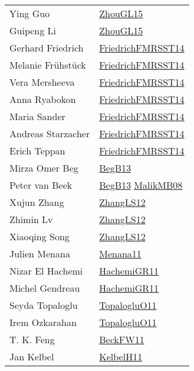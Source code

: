 {\begin{longtable}{p{4cm}p{15cm}}
Ying Guo & \href{papers/ZhouGL15.pdf}{ZhouGL15}\cite{ZhouGL15} \\
Guipeng Li & \href{papers/ZhouGL15.pdf}{ZhouGL15}\cite{ZhouGL15} \\
Gerhard Friedrich & \href{papers/FriedrichFMRSST14.pdf}{FriedrichFMRSST14}\cite{FriedrichFMRSST14} \\
Melanie Fr{\"{u}}hst{\"{u}}ck & \href{papers/FriedrichFMRSST14.pdf}{FriedrichFMRSST14}\cite{FriedrichFMRSST14} \\
Vera Mersheeva & \href{papers/FriedrichFMRSST14.pdf}{FriedrichFMRSST14}\cite{FriedrichFMRSST14} \\
Anna Ryabokon & \href{papers/FriedrichFMRSST14.pdf}{FriedrichFMRSST14}\cite{FriedrichFMRSST14} \\
Maria Sander & \href{papers/FriedrichFMRSST14.pdf}{FriedrichFMRSST14}\cite{FriedrichFMRSST14} \\
Andreas Starzacher & \href{papers/FriedrichFMRSST14.pdf}{FriedrichFMRSST14}\cite{FriedrichFMRSST14} \\
Erich Teppan & \href{papers/FriedrichFMRSST14.pdf}{FriedrichFMRSST14}\cite{FriedrichFMRSST14} \\
Mirza Omer Beg & \href{articles/BegB13.pdf}{BegB13}\cite{BegB13} \\
Peter van Beek & \href{articles/BegB13.pdf}{BegB13}\cite{BegB13} \href{articles/MalikMB08.pdf}{MalikMB08}\cite{MalikMB08} \\
Xujun Zhang & \href{papers/ZhangLS12.pdf}{ZhangLS12}\cite{ZhangLS12} \\
Zhimin Lv & \href{papers/ZhangLS12.pdf}{ZhangLS12}\cite{ZhangLS12} \\
Xiaoqing Song & \href{papers/ZhangLS12.pdf}{ZhangLS12}\cite{ZhangLS12} \\
Julien Menana & \href{}{Menana11}\cite{Menana11} \\
Nizar El Hachemi & \href{articles/HachemiGR11.pdf}{HachemiGR11}\cite{HachemiGR11} \\
Michel Gendreau & \href{articles/HachemiGR11.pdf}{HachemiGR11}\cite{HachemiGR11} \\
Seyda Topaloglu & \href{articles/TopalogluO11.pdf}{TopalogluO11}\cite{TopalogluO11} \\
Irem Ozkarahan & \href{articles/TopalogluO11.pdf}{TopalogluO11}\cite{TopalogluO11} \\
T. K. Feng & \href{articles/BeckFW11.pdf}{BeckFW11}\cite{BeckFW11} \\
Jan Kelbel & \href{articles/KelbelH11.pdf}{KelbelH11}\cite{KelbelH11} \\

\end{longtable}}
